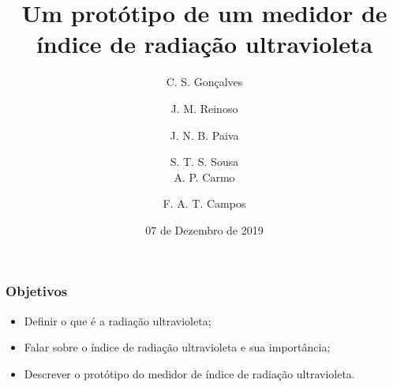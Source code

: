\documentclass{beamer}
\title[A radiação ultravioleta] %
	{Um protótipo de um medidor de índice de radiação ultravioleta}
\author%
{ C. S. Gonçalves\and J. M. Reinoso \and J. N. B. Paiva \and S. T. S. Sousa \\ A. P. Carmo \and F. A. T. Campos}
\institute[IFF - Campus Cabo Frio] %
{

  Instituto Federal Fluminense\\
  Cabo Frio
  
}
\date{07 de Dezembro de 2019}
\begin{document}
	

	\frame{\titlepage} 
	
	

	\begin{frame}
		\frametitle{Objetivos}
		\begin{itemize}
			\item Definir o que é a radiação ultravioleta;
			\item Falar sobre o índice de radiação ultravioleta e sua importância;
			\item Descrever o protótipo do medidor de índice de radiação ultravioleta.
		\end{itemize}

	\end{frame}
		
	
\end{document}
